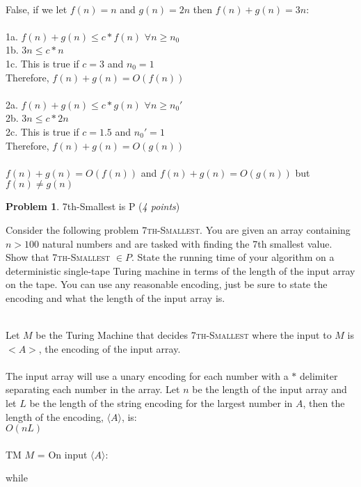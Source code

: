 \documentclass[11pt]{article}
\theoremstyle{definition}
\theoremstyle{theorem}
\newtheorem{prob}{Problem}
\newcommand{\solution}{\medskip\noindent{\color{blue}\textbf{Solution:}}}
\begin{document}
\begin{enumerate}[label=(\alph*)]
\solution \\
False, if we let $f(n) = n$ and $g(n) = 2n$ then $f(n) + g(n) = 3n$: \\~\\
1a. $f(n) + g(n) \leq c * f(n)$ \hspace{0.4cm} $\forall n \geq n_0$  \\
1b. $3n \leq c * n$ \hspace{0.4cm} \\ 
1c. This is true if $c = 3$ and $n_0 = 1$ \\
Therefore, $f(n) + g(n) = O(f(n))$ \\~\\
2a. $f(n) + g(n) \leq c * g(n)$ \hspace{0.4cm} $\forall n \geq n_0'$  \\
2b. $3n \leq c * 2n$ \hspace{0.4cm} \\ 
2c. This is true if $c = 1.5$ and $n_0' = 1$ \\
Therefore, $f(n) + g(n) = O(g(n))$ \\~\\
$f(n) + g(n) = O(f(n))$ and  $f(n) + g(n) = O(g(n))$ but $f(n) \neq g(n)$






\end{enumerate}


\newpage

\begin{prob} 7th-Smallest is P (\emph{4 points})\end{prob}

Consider the following problem \textsc{7th-Smallest}. You are given an array containing $n>100$ natural numbers and are tasked with finding the 7th smallest value. Show that \textsc{7th-Smallest} $\in P$. State the running time of your algorithm on a deterministic single-tape Turing machine in terms of the length of the input array on the tape. You can use any reasonable encoding, just be sure to state the encoding and what the length of the input array is.

\solution\\
Let $M$ be the Turing Machine that decides \textsc{7th-Smallest} where the input to $M$ is $<A>$, the encoding of the input array. \\~\\
The input array will use a unary encoding for each number with a $*$ delimiter separating each number in the array. Let $n$ be the length of the input array and let $L$ be the length of the string encoding for the largest number in $A$, then the length of the encoding, $\langle A \rangle$, is: \\
$O(nL)$ \\~\\
TM $M$ = On input $\langle A \rangle$: \\
\hspace*{0.5cm}
\begin{minipage}{.87\textwidth}
	while
\end{minipage}
\end{document}
